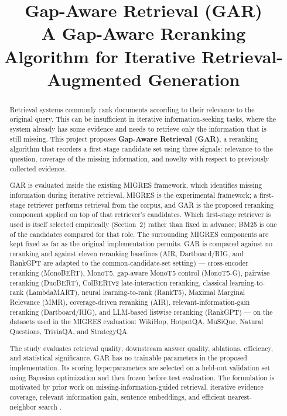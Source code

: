 \documentclass[11pt,a4paper]{article}
\title{\textbf{Gap-Aware Retrieval (GAR)}\\
\large A Gap-Aware Reranking Algorithm for Iterative Retrieval-Augmented Generation}
\author{}
\date{}
\begin{document}
\maketitle

\begin{abstract}
Retrieval systems commonly rank documents according to their relevance to the original query. This can be insufficient in iterative information-seeking tasks, where the system already has some evidence and needs to retrieve only the information that is still missing. This project proposes \textbf{Gap-Aware Retrieval (GAR)}, a reranking algorithm that reorders a first-stage candidate set using three signals: relevance to the question, coverage of the missing information, and novelty with respect to previously collected evidence.

GAR is evaluated inside the existing MIGRES framework, which identifies missing information during iterative retrieval. MIGRES is the experimental framework; a first-stage retriever performs retrieval from the corpus, and GAR is the proposed reranking component applied on top of that retriever's candidates. Which first-stage retriever is used is itself selected empirically (Section~2) rather than fixed in advance; BM25 is one of the candidates compared for that role. The surrounding MIGRES components are kept fixed as far as the original implementation permits. GAR is compared against no reranking and against eleven reranking baselines (AIR, Dartboard/RIG, and RankGPT are adapted to the common-candidate-set setting) --- cross-encoder reranking (MonoBERT), MonoT5, gap-aware MonoT5 control (MonoT5-G), pairwise reranking (DuoBERT), ColBERTv2 late-interaction reranking, classical learning-to-rank (LambdaMART), neural learning-to-rank (RankT5), Maximal Marginal Relevance (MMR), coverage-driven reranking (AIR), relevant-information-gain reranking (Dartboard/RIG), and LLM-based listwise reranking (RankGPT) --- on the datasets used in the MIGRES evaluation: WikiHop, HotpotQA, MuSiQue, Natural Questions, TriviaQA, and StrategyQA.

The study evaluates retrieval quality, downstream answer quality, ablations, efficiency, and statistical significance. GAR has no trainable parameters in the proposed implementation. Its scoring hyperparameters are selected on a held-out validation set using Bayesian optimization and then frozen before test evaluation. The formulation is motivated by prior work on missing-information-guided retrieval, iterative evidence coverage, relevant information gain, sentence embeddings, and efficient nearest-neighbor search \citep{wang-etal-2025-llms,yadav-etal-2020-unsupervised,pickett-etal-2024-rig,reimers-gurevych-2019-sentence,johnson-etal-2017-faiss}.
\end{abstract}
\end{document}

